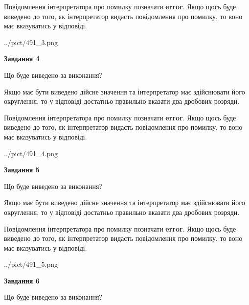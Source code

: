 \documentclass[12pt, ukrainian]{article}
\begin{document}
{\begin {Large}
Повідомлення інтерпретатора про помилку позначати \textbf{error}.
Якщо щось буде виведено до того, як інтерпретатор видасть повідомлення про помилку, 
то воно має вказуватись у відповіді. \par

\begin{center}
	{../pict/491_3.png}
\end{center}
\newpage

{\begin {center}\textbf{Завдання 4}\end {center}}\par
Що буде виведено за виконання? \par

Якщо має бути виведено дійсне значення та інтерпретатор має здійснювати його округлення, 
то у відповіді достатньо правильно вказати два дробових розряди.

Повідомлення інтерпретатора про помилку позначати \textbf{error}.
Якщо щось буде виведено до того, як інтерпретатор видасть повідомлення про помилку, 
то воно має вказуватись у відповіді. \par

\begin{center}
	{../pict/491_4.png}
\end{center}
\newpage

{\begin {center}\textbf{Завдання 5}\end {center}}\par
Що буде виведено за виконання? \par

Якщо має бути виведено дійсне значення та інтерпретатор має здійснювати його округлення, 
то у відповіді достатньо правильно вказати два дробових розряди.

Повідомлення інтерпретатора про помилку позначати \textbf{error}.
Якщо щось буде виведено до того, як інтерпретатор видасть повідомлення про помилку, 
то воно має вказуватись у відповіді. \par

\begin{center}
	{../pict/491_5.png}
\end{center}
\newpage

{\begin {center}\textbf{Завдання 6}\end {center}}\par
Що буде виведено за виконання? \par


\end{Large}}
\end{document}
